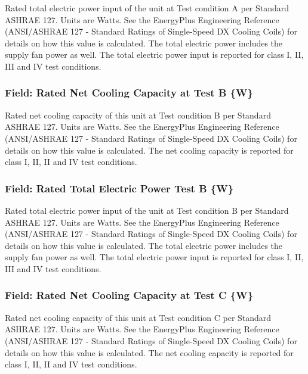 Rated total electric power input of the unit at Test condition A per Standard ASHRAE 127. Units are Watts. See the EnergyPlus Engineering Reference (ANSI/ASHRAE 127 - Standard Ratings of Single-Speed DX Cooling Coils) for details on how this value is calculated. The total electric power includes the supply fan power as well. The total electric power input is reported for class I, II, III and IV test conditions.

\subsubsection{Field: Rated Net Cooling Capacity at Test B \{W\}}\label{field-rated-net-cooling-capacity-at-test-b-w}

Rated net cooling capacity of this unit at Test condition B per Standard ASHRAE 127. Units are Watts. See the EnergyPlus Engineering Reference (ANSI/ASHRAE 127 - Standard Ratings of Single-Speed DX Cooling Coils) for details on how this value is calculated. The net cooling capacity is reported for class I, II, II and IV test conditions.

\subsubsection{Field: Rated Total Electric Power Test B \{W\}}\label{field-rated-total-electric-power-test-b-w}

Rated total electric power input of the unit at Test condition B per Standard ASHRAE 127. Units are Watts. See the EnergyPlus Engineering Reference (ANSI/ASHRAE 127 - Standard Ratings of Single-Speed DX Cooling Coils) for details on how this value is calculated. The total electric power includes the supply fan power as well. The total electric power input is reported for class I, II, III and IV test conditions.

\subsubsection{Field: Rated Net Cooling Capacity at Test C \{W\}}\label{field-rated-net-cooling-capacity-at-test-c-w}

Rated net cooling capacity of this unit at Test condition C per Standard ASHRAE 127. Units are Watts. See the EnergyPlus Engineering Reference (ANSI/ASHRAE 127 - Standard Ratings of Single-Speed DX Cooling Coils) for details on how this value is calculated. The net cooling capacity is reported for class I, II, II and IV test conditions.

